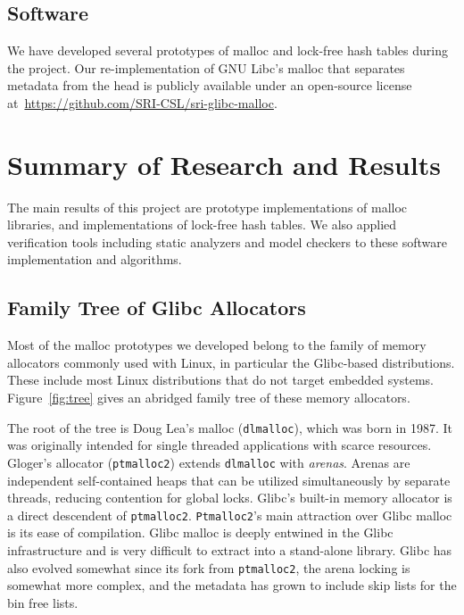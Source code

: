 \documentclass[12pt]{cslreport}
\begin{document}
\section{Software}

We have developed several prototypes of malloc and lock-free hash
tables during the project. Our re-implementation of GNU Libc's malloc
that separates metadata from the head is publicly available under an
open-source license at~\url{https://github.com/SRI-CSL/sri-glibc-malloc}.




\chapter{Summary of Research and Results}

The main results of this project are prototype implementations of
malloc libraries, and implementations of lock-free hash tables. We
also applied verification tools including static analyzers and model
checkers to these software implementation and algorithms.

\section{Family Tree of Glibc Allocators}
\label{family-tree}

Most of the malloc prototypes we developed belong to the family of
memory allocators commonly used with Linux, in particular the
Glibc-based distributions.  These include most Linux distributions
that do not target embedded systems. Figure~\ref{fig:tree} gives an
abridged family tree of these memory allocators.

The root of the tree is Doug Lea's malloc (\texttt{dlmalloc}), which
was born in 1987.  It was originally intended for single threaded
applications with scarce resources.
%
Gloger's allocator (\texttt{ptmalloc2}) extends \texttt{dlmalloc} with
\emph{arenas}.  Arenas are independent self-contained heaps that can
be utilized simultaneously by separate threads, reducing contention
for global locks.
%
Glibc's built-in memory allocator is a direct descendent of
\texttt{ptmalloc2}. \texttt{Ptmalloc2}'s main attraction over Glibc
malloc is its ease of compilation. Glibc malloc is deeply entwined in
the Glibc infrastructure and is very difficult to extract into a
stand-alone library.  Glibc has also evolved somewhat since its fork
from \texttt{ptmalloc2}, the arena locking is somewhat more complex,
and the metadata has grown to include skip lists for the bin free
lists.
\end{document}

